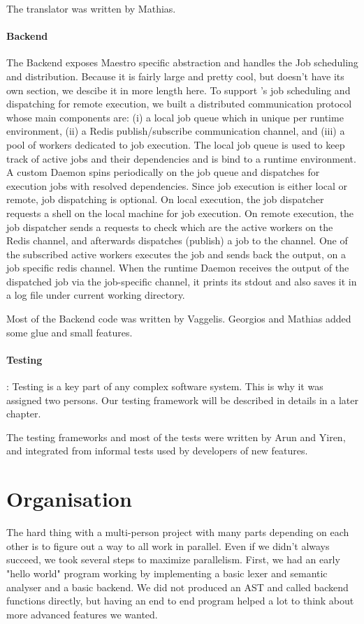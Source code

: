 The translator was written by Mathias.

\paragraph{Backend}

The Backend exposes Maestro specific abstraction and handles the Job scheduling and distribution.
Because it is fairly large and pretty cool, but doesn't have its own section, we descibe it in more length here.
To support \lang{}'s job scheduling and dispatching for remote execution, we
built a distributed communication protocol whose main components are: (i)
a local job queue which in unique per runtime environment, (ii) a Redis
publish/subscribe communication channel, and (iii) a pool of workers dedicated
to job execution. The local job queue is used to keep track of active jobs
and their dependencies and is bind to a runtime environment. A custom Daemon
spins periodically on the job queue and dispatches for execution jobs with
resolved dependencies. Since job execution is either local or remote, job
dispatching is optional. On local execution, the job dispatcher requests a
shell on the local machine for job execution. On remote execution, the job
dispatcher sends a requests to check which are the active workers on the Redis
channel, and afterwards dispatches (publish) a job to the channel. One of the
subscribed active workers executes the job and sends back the output, on a job
specific redis channel. When the runtime Daemon receives the output of the
dispatched job via the job-specific channel, it prints its stdout and also
saves it in a log file under current working directory.

Most of the Backend code was written by Vaggelis. Georgios and Mathias added some glue and small features.

\paragraph{Testing}:
Testing is a key part of any complex software system.
This is why it was assigned two persons.
Our testing framework will be described in details in a later chapter.

The testing frameworks and most of the tests were written by Arun and Yiren, and integrated from informal tests used by developers of new features.


\section{Organisation}
The hard thing with a multi-person project with many parts depending on each other is to figure out a way to all work in parallel.
Even if we didn't always succeed, we took several steps to maximize parallelism.
First, we had an early "hello world" program working by implementing a basic lexer and semantic analyser and a basic backend.
We did not produced an AST and called backend functions directly, but having an end to end program helped a lot to think about more advanced features we wanted.


